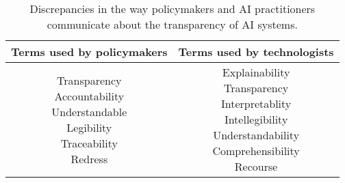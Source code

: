 \begin{table}[h!]
\centering
\label{tab:data}
\small
\begin{tabular}{ cc }
\toprule
{\bf Terms used by policymakers} & {\bf Terms used by technologists} \\
\midrule
\makecell{Transparency \\ Accountability \\ Understandable \\ Legibility \\ Traceability \\ Redress} & \makecell{Explainability \\ Transparency \\ Interpretablity \\ Intellegibility \\ Understandability \\ Comprehensibility \\ Recourse} \\
\bottomrule
\end{tabular}
\caption{Discrepancies in the way policymakers and AI practitioners communicate about the transparency of AI systems.}
\end{table}